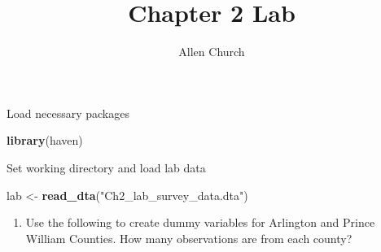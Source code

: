 \documentclass[]{article}
\title{Chapter 2 Lab}
\author{Allen Church}
\date{}
\newenvironment{Shaded}{\begin{snugshade}}{\end{snugshade}}
\newcommand{\KeywordTok}[1]{\textcolor[rgb]{0.13,0.29,0.53}{\textbf{#1}}}
\newcommand{\StringTok}[1]{\textcolor[rgb]{0.31,0.60,0.02}{#1}}
\newcommand{\NormalTok}[1]{#1}
\providecommand{\tightlist}{%
  \setlength{\itemsep}{0pt}\setlength{\parskip}{0pt}}
\begin{document}
\maketitle

Load necessary packages

\begin{Shaded}
\begin{Highlighting}[]
\KeywordTok{library}\NormalTok{(haven)}
\end{Highlighting}
\end{Shaded}

Set working directory and load lab data

\begin{Shaded}
\begin{Highlighting}[]
\NormalTok{lab <-}\StringTok{ }\KeywordTok{read_dta}\NormalTok{(}\StringTok{"Ch2_lab_survey_data.dta"}\NormalTok{)}
\end{Highlighting}
\end{Shaded}

\begin{enumerate}
\def\labelenumi{\arabic{enumi})}
\tightlist
\item
  Use the following to create dummy variables for Arlington and Prince
  William Counties. How many observations are from each county?
\end{enumerate}
\end{document}
